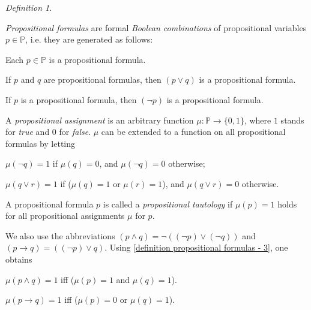 \documentclass[a4paper, 11pt]{amsart}
\theoremstyle{remark}
\newtheorem{definition}[definition]{Definition}
\newcommand{\PP}{\mathbb{P}}
\newenvironment{enumerate-(a)}{\begin{enumerate}[label={\upshape (\alph*)}, leftmargin=2pc]}{\end{enumerate}}
\newenvironment{enumerate-(1)}{\begin{enumerate}[label={\upshape (\arabic*)}, leftmargin=2pc]}{\end{enumerate}}
\begin{document}
\begin{definition} 
\label{definition propositional formulas} \ 
\begin{enumerate-(1)} 
\item 
\emph{Propositional formulas} are formal \emph{Boolean combinations} of propositional variables $p\in \PP$, i.e. they are generated as follows: 
\begin{enumerate-(a)} 
\item 
Each $p\in \PP$ is a propositional formula. 
\item 
If $p$ and $q$ are propositional formulas, then $(p\vee q)$ is a propositional formula. 
\item 
If $p$ is a propositional formula, then $(\neg p)$ is a propositional formula. 
\end{enumerate-(a)} 
\item 
\label{definition propositional formulas - 3} 
A \emph{propositional assignment} is an arbitrary function $\mu\colon \PP \rightarrow \{0,1\}$, where $1$ stands for \emph{true} and $0$ for \emph{false}. 
$\mu$ can be extended to a function on all propositional formulas by letting 
\begin{enumerate-(a)} 
\item 
$\mu(\neg q)=1$ if $\mu(q)=0$, and $\mu(\neg q)=0$ otherwise; 
\item 
$\mu(q\vee r)=1$ if ($\mu(q)=1$ or $\mu(r)=1$), and $\mu(q\vee r)=0$ otherwise. 
\end{enumerate-(a)} 
\item 
A propositional formula $p$ is called a 
 \emph{propositional tautology} if $\mu(p)=1$ holds for all propositional assignments $\mu$ for $p$. 
\end{enumerate-(1)} 
\end{definition} 

We also use the abbreviations $(p\wedge q )=\neg( (\neg p) \vee (\neg q))$ and $(p\rightarrow q )=((\neg p) \vee q)$. 
Using \ref{definition propositional formulas - 3}, one obtains 

\begin{enumerate-(a)} 
\item 
$\mu(p\wedge q)=1$ iff ($\mu(p)=1$ and $\mu(q)=1$).  
\item 
$\mu(p\rightarrow q)=1$ iff ($\mu(p)=0$ or $\mu(q)=1$).  
\end{enumerate-(a)} 
\end{document}
